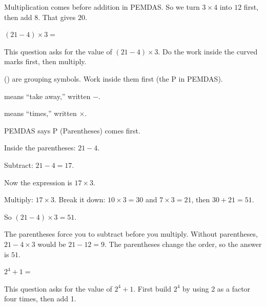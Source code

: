 
Multiplication comes before addition in PEMDAS. So we turn $3 \times 4$ into $12$
first, then add $8$. That gives $20$.


$(21 - 4) \times 3 = $\ansblank


This question asks for the value of $(21 - 4) \times 3$. Do the work inside the
curved marks first, then multiply.

\begin{words}
  \item {}(\;) are grouping symbols. Work inside them first (the P in PEMDAS).
  \item {}means ``take away,'' written $-$.
  \item {}means ``times,'' written $\times$.
\end{words}

\begin{steps}
  \item PEMDAS says P (Parentheses) comes first.
  \item Inside the parentheses: $21 - 4$.
  \item Subtract: $21 - 4 = 17$.
  \item Now the expression is $17 \times 3$.
  \item Multiply: $17 \times 3$. Break it down: $10 \times 3 = 30$ and $7 \times 3 = 21$, then $30 + 21 = 51$.
  \item So $(21 - 4) \times 3 = 51$.
\end{steps}


The parentheses force you to subtract before you multiply. Without parentheses,
$21 - 4 \times 3$ would be $21 - 12 = 9$. The parentheses change the order, so the
answer is $51$.


$2^{4} + 1 = $\ansblank


This question asks for the value of $2^{4} + 1$. First build $2^{4}$ by using 2 as
a factor four times, then add 1.

